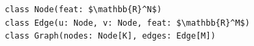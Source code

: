 \documentclass[border=10pt]{standalone}
\begin{document}
\begin{lstlisting}
class Node(feat: $\mathbb{R}^N$)
class Edge(u: Node, v: Node, feat: $\mathbb{R}^M$)
class Graph(nodes: Node[K], edges: Edge[M])
\end{lstlisting}
\end{document}
